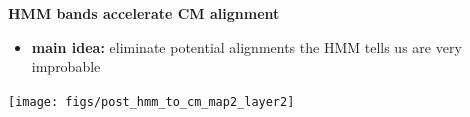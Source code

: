 \documentclass[landscape]{slides}
\begin{document}
\begin{slide}
\begin{center}

\textbf{HMM bands accelerate CM alignment}
\end{center}
\medskip
\small
\begin{itemize}
\item
\textbf{main idea:} eliminate potential alignments the HMM tells us are very improbable
\end{itemize}
\begin{center}
\texttt{[image: figs/post\_hmm\_to\_cm\_map2\_layer2]}
\end{center}
\vfill
\end{slide}
\end{document}

